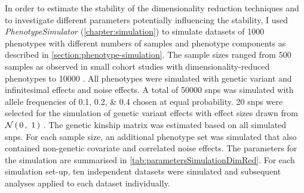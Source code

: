 In order to estimate the stability of the dimensionality reduction techniques and to investigate different parameters potentially influencing the stability, I used \textit{PhenotypeSimulator} (\cref{chapter:simulation}) to simulate datasets of \num{1000} phenotypes with different numbers of samples and phenotype components as described in \cref{section:phenotype-simulation}. The sample sizes ranged from \num{500} samples as observed in small cohort studies with dimensionality-reduced phenotypes \citep{Pausova2007} to \num{10000} \citep{Liu2012}. All phenotypes were simulated with genetic variant and infinitesimal effects and noise effects. A total of \num{50000} \glspl{snp} was simulated with allele frequencies of \numlist{0.1;0.2;0.4} chosen at equal probability. \num{20} \glspl{snp} were selected for the simulation of genetic variant effects with effect sizes drawn from \(\mathcal{N}\left(\,{0}\,,~{1}\,\right)\) . The genetic kinship matrix was estimated based on all simulated \glspl{snp}. For each sample size, an additional phenotype set was simulated that also contained non-genetic covariate and correlated noise effects. The parameters for the simulation are summarised in \cref{tab:parametersSimulationDimRed}. For each simulation set-up, ten independent datasets were simulated and subsequent analyses applied to each dataset individually.

